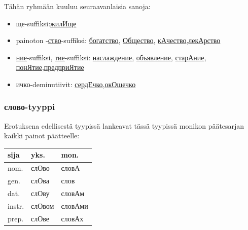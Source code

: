 \documentclass[]{scrreprt}
\providecommand{\tightlist}{%
  \setlength{\itemsep}{0pt}\setlength{\parskip}{0pt}}
\begin{document}
Tähän ryhmään kuuluu seuraavanlaisia sanoja:

\begin{itemize}
\tightlist
\item
  ще-suffiksi:\href{http://ru.wiktionary.org/wiki/\%D0\%B6\%D0\%B8\%D0\%BB\%D0\%B8\%D1\%89\%D0\%B5}{жилИще}
\item
  painoton
  -\href{http://ru.wiktionary.org/wiki/\%D1\%81\%D1\%82\%D0\%B2\%D0\%BE}{ство}-suffiksi:
  \href{http://ru.wiktionary.org/wiki/\%D0\%B1\%D0\%BE\%D0\%B3\%D0\%B0\%D1\%82\%D1\%81\%D1\%82\%D0\%B2\%D0\%BE}{богатство},
  \href{http://ru.wiktionary.org/wiki/\%D0\%BE\%D0\%B1\%D1\%89\%D0\%B5\%D1\%81\%D1\%82\%D0\%B2\%D0\%BE}{Общество},
  \href{http://ru.wiktionary.org/wiki/\%D0\%BA\%D0\%B0\%D1\%87\%D0\%B5\%D1\%81\%D1\%82\%D0\%B2\%D0\%BE}{кАчество},\href{http://ru.wiktionary.org/wiki/\%D0\%BB\%D0\%B5\%D0\%BA\%D0\%B0\%D1\%80\%D1\%81\%D1\%82\%D0\%B2\%D0\%BE}{лекАрство}
\item
  \href{http://ru.wiktionary.org/wiki/\%D0\%BD\%D0\%B8\%D0\%B5}{ние}-suffiksi,
  \href{http://ru.wiktionary.org/wiki/\%D1\%82\%D0\%B8\%D0\%B5}{тие}-suffiksi:
  \href{http://ru.wiktionary.org/wiki/\%D0\%BD\%D0\%B0\%D1\%81\%D0\%BB\%D0\%B0\%D0\%B6\%D0\%B4\%D0\%B5\%D0\%BD\%D0\%B8\%D0\%B5}{наслаждение},
  \href{http://ru.wiktionary.org/wiki/\%D0\%BE\%D0\%B1\%D1\%8A\%D1\%8F\%D0\%B2\%D0\%BB\%D0\%B5\%D0\%BD\%D0\%B8\%D0\%B5}{объявление},
  \href{http://ru.wiktionary.org/wiki/\%D1\%81\%D1\%82\%D0\%B0\%D1\%80\%D0\%B0\%D0\%BD\%D0\%B8\%D0\%B5}{старАние},
  \href{http://ru.wiktionary.org/wiki/\%D0\%BF\%D0\%BE\%D0\%BD\%D1\%8F\%D1\%82\%D0\%B8\%D0\%B5}{понЯтие},\href{http://ru.wiktionary.org/wiki/\%D0\%BF\%D1\%80\%D0\%B5\%D0\%B4\%D0\%BF\%D1\%80\%D0\%B8\%D1\%8F\%D1\%82\%D0\%B8\%D0\%B5}{предприЯтие}
\item
  ичко-deminutiivit:
  \href{http://ru.wiktionary.org/wiki/\%D1\%81\%D0\%B5\%D1\%80\%D0\%B4\%D0\%B5\%D1\%87\%D0\%BA\%D0\%BE}{сердЕчко},\href{http://ru.wiktionary.org/wiki/\%D0\%BE\%D0\%BA\%D0\%BE\%D1\%88\%D0\%B5\%D1\%87\%D0\%BA\%D0\%BE}{окОшечко}
\end{itemize}

\subsubsection{слово-tyyppi}\label{ux441ux43bux43eux432ux43e-tyyppi}

Erotuksena edellisestä tyypissä lankeavat tässä tyypissä monikon
päätesarjan kaikki painot päätteelle:

\begin{longtable}[c]{@{}lll@{}}
\toprule
sija & yks. & mon.\tabularnewline
\midrule
\endhead
nom. & слОво & словА\tabularnewline
gen. & слОва & слов\tabularnewline
dat. & слОву & словАм\tabularnewline
instr. & слОвом & словАми\tabularnewline
prep. & слОве & словАх\tabularnewline
\bottomrule
\end{longtable}
\end{document}
